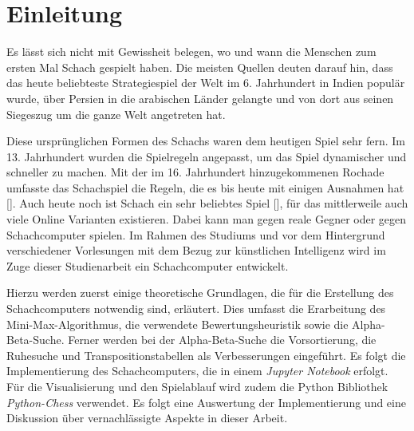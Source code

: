 \section{Einleitung}

\glqq Es lässt sich nicht mit Gewissheit belegen, wo und wann die Menschen zum ersten Mal Schach gespielt haben.
Die meisten Quellen deuten darauf hin, dass das heute beliebteste Strategiespiel der Welt im 6. Jahrhundert in Indien populär wurde, über Persien in die arabischen Länder gelangte und von dort aus seinen Siegeszug um die ganze Welt angetreten hat.

Diese ursprünglichen Formen des Schachs waren dem heutigen Spiel sehr fern.
Im 13. Jahrhundert wurden die Spielregeln angepasst, um das Spiel dynamischer und schneller zu machen.
Mit der im 16. Jahrhundert hinzugekommenen Rochade umfasste das Schachspiel die Regeln, die es bis heute mit einigen Ausnahmen hat [\cite{Gifhorn}].
Auch heute noch ist Schach ein sehr beliebtes Spiel [\cite{Kreuzberg}], für das mittlerweile auch viele Online Varianten existieren.
Dabei kann man gegen reale Gegner oder gegen Schachcomputer spielen.
Im Rahmen des Studiums und vor dem Hintergrund verschiedener Vorlesungen mit dem Bezug zur künstlichen Intelligenz wird im Zuge dieser Studienarbeit ein Schachcomputer entwickelt.

Hierzu werden zuerst einige theoretische Grundlagen, die für die Erstellung des Schachcomputers notwendig sind, erläutert.
Dies umfasst die Erarbeitung des Mini-Max-Algorithmus, die verwendete Bewertungsheuristik sowie die Alpha-Beta-Suche.
Ferner werden bei der Alpha-Beta-Suche die Vorsortierung, die Ruhesuche und Transpositionstabellen als Verbesserungen eingeführt.
Es folgt die Implementierung des Schachcomputers, die in einem \textit{Jupyter Notebook} erfolgt.
Für die Visualisierung und den Spielablauf wird zudem die Python Bibliothek \textit{Python-Chess} verwendet.
Es folgt eine Auswertung der Implementierung und eine Diskussion über vernachlässigte Aspekte in dieser Arbeit.
